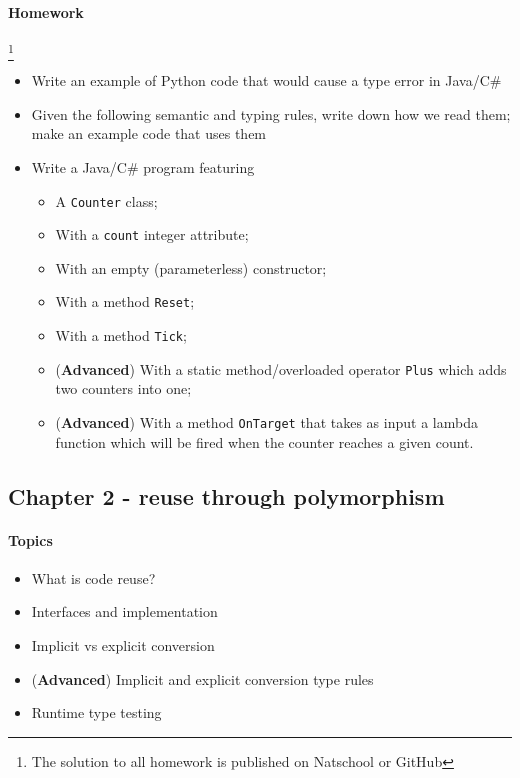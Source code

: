 		\paragraph*{Homework}\footnote{The solution to all homework is published on Natschool or GitHub}
		\begin{itemize}
			\item Write an example of Python code that would cause a type error in Java/C\#
			\item Given the following semantic and typing rules, write down how we read them; make an example code that uses them
			\item Write a Java/C\# program featuring
			\begin{itemize}
				\item A \texttt{Counter} class;
				\item With a \texttt{count} integer attribute;
				\item With an empty (parameterless) constructor;
				\item With a method \texttt{Reset};
				\item With a method \texttt{Tick};
				\item (\textbf{Advanced}) With a static method/overloaded operator \texttt{Plus} which adds two counters into one;
				\item (\textbf{Advanced}) With a method \texttt{OnTarget} that takes as input a lambda function which will be fired when the counter reaches a given count.
			\end{itemize}
		\end{itemize}
		
		
		
		\subsection{Chapter 2 - reuse through polymorphism}
		
		\paragraph*{Topics}			
		\begin{itemize}
			\item What is code reuse?
			\item Interfaces and implementation
			\item Implicit vs explicit conversion
			\item (\textbf{Advanced}) Implicit and explicit conversion type rules
			\item Runtime type testing
		\end{itemize}
		

